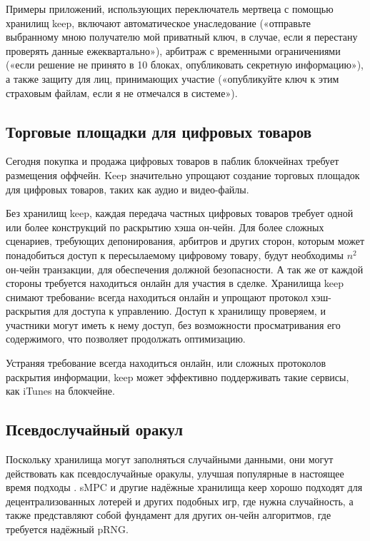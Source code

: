 \documentclass[russian,english,11pt]{article}
\begin{document}
Примеры приложений, использующих переключатель мертвеца с помощью 
хранилищ keep, включают автоматическое унаследование («отправьте 
выбранному мною получателю мой приватный ключ, в случае, если я 
перестану проверять данные ежеквартально»), арбитраж с временными 
ограничениями («если решение не принято в 10 блоках, опубликовать 
секретную информацию»), а также защиту для лиц, принимающих участие 
(«опубликуйте ключ к этим страховым файлам, если я не отмечался в 
системе»).

\subsection{Торговые площадки для цифровых товаров}

Сегодня покупка и продажа цифровых товаров в паблик блокчейнах 
требует размещения оффчейн. Keep значительно упрощают создание 
торговых площадок для цифровых товаров, таких как аудио и видео-файлы.

Без хранилищ keep, каждая передача частных цифровых товаров требует 
одной или более конструкций по раскрытию хэша он-чейн. Для более 
сложных сценариев, требующих депонирования, арбитров и других сторон, 
которым может понадобиться доступ к пересылаемому цифровому товару, 
будут необходимы ${n^2}$ он-чейн транзакции, для обеспечения должной 
безопасности. А так же от каждой стороны требуется находиться онлайн 
для участия в сделке.  Хранилища keep снимают требованиe всегда 
находиться онлайн и упрощают протокол хэш-раскрытия для доступа к 
управлению. Доступ к хранилищу проверяем, и участники могут иметь к 
нему доступ, без возможности просматривания его содержимого, что 
позволяет продолжать оптимизацию. 

Устраняя требование всегда находиться онлайн, или сложных протоколов 
раскрытия информации, keep может эффективно поддерживать такие сервисы, 
как iTunes на блокчейне.

\subsection{Псевдослучайный оракул}

Поскольку хранилища могут заполняться случайными данными, они могут 
действовать как псевдослучайные оракулы, улучшая популярные в настоящее 
время подходы \cite{prngStackexchange}. sMPC и другие надёжные 
хранилища кеер хорошо подходят для децентрализованных лотерей и других 
подобных игр, где нужна случайность, а также представляют собой 
фундамент для других он-чейн алгоритмов, где требуется надёжный pRNG. 
\end{document}
